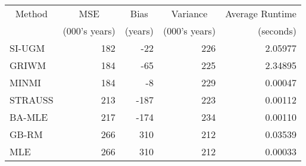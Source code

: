 
\begin{tabular}{lrrrr}
\toprule
\multicolumn{1}{c}{Method} & \multicolumn{1}{c}{MSE} & \multicolumn{1}{c}{Bias} & \multicolumn{1}{c}{Variance} & \multicolumn{1}{c}{Average Runtime} \\
\cmidrule(l{3pt}r{3pt}){1-1} \cmidrule(l{3pt}r{3pt}){2-2} \cmidrule(l{3pt}r{3pt}){3-3} \cmidrule(l{3pt}r{3pt}){4-4} \cmidrule(l{3pt}r{3pt}){5-5}
 & (000's years) & (years) & (000's years) & (seconds)\\
\midrule
SI-UGM & 182 & -22 & 226 & 2.05977\\
GRIWM & 184 & -65 & 225 & 2.34895\\
MINMI & 184 & -8 & 229 & 0.00047\\
STRAUSS & 213 & -187 & 223 & 0.00112\\
BA-MLE & 217 & -174 & 234 & 0.00110\\
\addlinespace
GB-RM & 266 & 310 & 212 & 0.03539\\
MLE & 266 & 310 & 212 & 0.00033\\
\bottomrule
\end{tabular}
